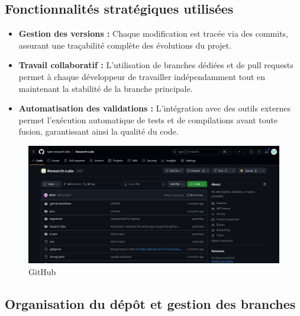 \documentclass{rapportPfe}
\begin{document}
\subsection{Fonctionnalités stratégiques utilisées}

\begin{itemize}
    \item \textbf{Gestion des versions :} Chaque modification est tracée via des commits, assurant une traçabilité complète des évolutions du projet.
    \item \textbf{Travail collaboratif :} L’utilisation de branches dédiées et de pull requests permet à chaque développeur de travailler indépendamment tout en maintenant la stabilité de la branche principale.
    \item \textbf{Automatisation des validations :} L’intégration avec des outils externes permet l’exécution automatique de tests et de compilations avant toute fusion, garantissant ainsi la qualité du code.
\end{itemize}

\FloatBarrier
\begin{figure}[htbp]
    \centering
    \includegraphics[width=1.0\textwidth]{diagrams/ss_02.png}
    \caption{GitHub}
    \label{fig:diagram5}
\end{figure}

\subsection{Organisation du dépôt et gestion des branches}
\end{document}
